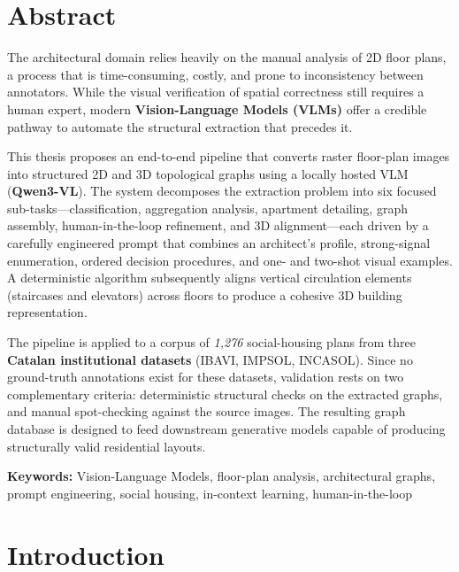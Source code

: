 \documentclass[12pt,a4paper,openright]{report}
\begin{document}
\chapter*{Abstract}

The architectural domain relies heavily on the manual analysis of 2D floor plans, a process that is time-consuming, costly, and prone to inconsistency between annotators. While the visual verification of spatial correctness still requires a human expert, modern \textbf{Vision-Language Models (VLMs)} offer a credible pathway to automate the structural extraction that precedes it.

This thesis proposes an end-to-end pipeline that converts raster floor-plan images into structured 2D and 3D topological graphs using a locally hosted VLM (\textbf{Qwen3-VL}). The system decomposes the extraction problem into six focused sub-tasks---classification, aggregation analysis, apartment detailing, graph assembly, human-in-the-loop refinement, and 3D alignment---each driven by a carefully engineered prompt that combines an architect's profile, strong-signal enumeration, ordered decision procedures, and one- and two-shot visual examples. A deterministic algorithm subsequently aligns vertical circulation elements (staircases and elevators) across floors to produce a cohesive 3D building representation.

The pipeline is applied to a corpus of \textit{1,276} social-housing plans from three \textbf{Catalan institutional datasets} (IBAVI, IMPSOL, INCASOL). Since no ground-truth annotations exist for these datasets, validation rests on two complementary criteria: deterministic structural checks on the extracted graphs, and manual spot-checking against the source images. The resulting graph database is designed to feed downstream generative models capable of producing structurally valid residential layouts.

\medskip
\noindent\textbf{Keywords:} Vision-Language Models, floor-plan analysis, architectural graphs, prompt engineering, social housing, in-context learning, human-in-the-loop

\newpage
\renewcommand{\contentsname}{Contents}
\tableofcontents

\newpage

\chapter{Introduction}
\end{document}
